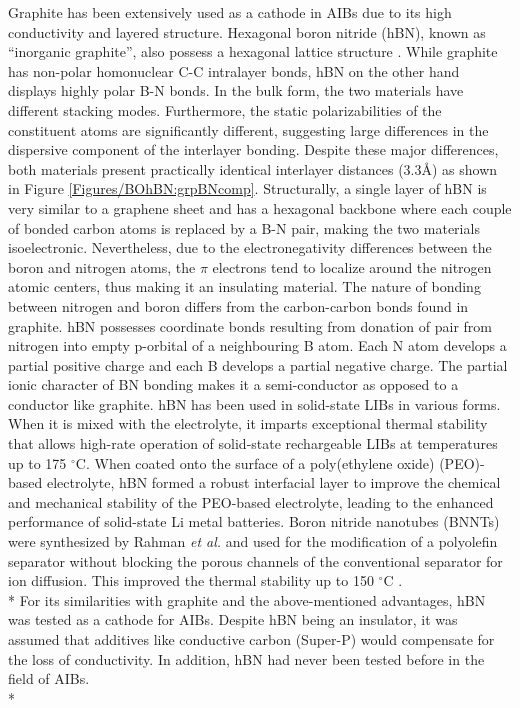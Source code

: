 Graphite has been extensively used as a cathode in AIBs due to its high conductivity and layered structure. Hexagonal boron nitride (hBN), known as \enquote{inorganic graphite}, also possess a hexagonal lattice structure \cite{hod_graphite_2012}. While graphite has non-polar homonuclear C-C intralayer bonds, hBN on the other hand displays highly polar B-N bonds. In the bulk form, the two materials have different stacking modes. Furthermore, the static polarizabilities of the constituent atoms are significantly different, suggesting large differences in the dispersive component of the interlayer bonding\cite{song_large_2010, zeng_white_2010}. Despite these major differences, both materials present practically identical interlayer distances (3.3\AA) as shown in  Figure \ref{Figures/BOhBN:grpBNcomp}. Structurally, a single layer of hBN is very similar to a graphene sheet and has a hexagonal backbone where each couple of bonded carbon atoms is replaced by a B-N pair, making the two materials isoelectronic. Nevertheless, due to the electronegativity differences between the boron and nitrogen atoms, the $\pi$ electrons tend to localize around the nitrogen atomic centers, thus making it an insulating material. The nature of bonding between nitrogen and boron differs from the carbon-carbon bonds found in graphite. hBN possesses coordinate bonds resulting from donation of  pair from nitrogen into empty p-orbital of a neighbouring B atom. Each N atom develops a partial positive charge and each B develops a partial negative charge. The partial ionic character of BN bonding makes it a semi-conductor as opposed to a conductor like graphite. hBN has been used in solid-state LIBs in various forms. When it is mixed with the electrolyte, it imparts exceptional thermal stability that allows high-rate operation of solid-state rechargeable LIBs at temperatures up to 175 $^{\circ}$C\cite{hyun_high-modulus_2019}. When coated onto the surface of a poly(ethylene oxide) (PEO)-based electrolyte, hBN formed a robust interfacial layer to improve the chemical and mechanical stability of the PEO-based electrolyte, leading to the enhanced performance of solid-state Li metal batteries\cite{shen_chemically_2019}. Boron nitride nanotubes (BNNTs) were synthesized by Rahman \textit{et al.} and used for the modification of a polyolefin separator without blocking the porous channels of the conventional separator for  ion diffusion. This improved the thermal stability up to 150 $^{\circ}$C \cite{rahman_high_2019}.\\*
For its similarities with graphite and the above-mentioned advantages, hBN was tested as a cathode for AIBs. Despite hBN being an insulator, it was assumed that additives like conductive carbon (Super-P) would compensate for the loss of conductivity. In addition, hBN had never been tested before in the field of AIBs.\\* 

